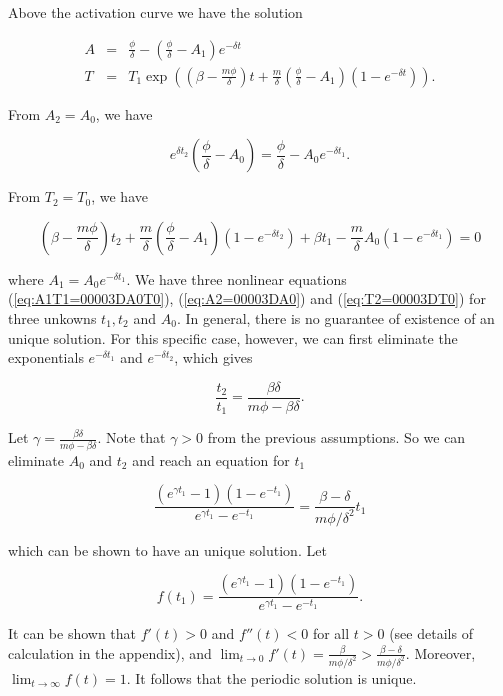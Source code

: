 \documentclass[review,authoryear]{elsarticle}
\begin{document}
Above the activation curve we have the solution 
\begin{linenomath*}
\begin{eqnarray*}
A & = & \frac{\phi}{\delta}-(\frac{\phi}{\delta}-A_{1})e^{-\delta t}\\
T & = & T_{1}\exp((\beta-\frac{m\phi}{\delta})t+\frac{m}{\delta}(\frac{\phi}{\delta}-A_{1})(1-e^{-\delta t})).
\end{eqnarray*}
\end{linenomath*}
From $A_{2}=A_{0}$, we have 
\begin{linenomath*}
\begin{equation}
e^{\delta t_{2}}(\frac{\phi}{\delta}-A_{0})=\frac{\phi}{\delta}-A_{0}e^{-\delta t_{1}}.\label{eq:A2=00003DA0}
\end{equation}
\end{linenomath*}
From $T_{2}=T_{0}$, we have
\begin{linenomath*} 
\begin{equation}
(\beta-\frac{m\phi}{\delta})t_{2}+\frac{m}{\delta}(\frac{\phi}{\delta}-A_{1})(1-e^{-\delta t_{2}})+\beta t_{1}-\frac{m}{\delta}A_{0}(1-e^{-\delta t_{1}})=0\label{eq:T2=00003DT0}
\end{equation}
\end{linenomath*}
where $A_{1}=A_{0}e^{-\delta t_{1}}$. We have three nonlinear equations (\ref{eq:A1T1=00003DA0T0}),
(\ref{eq:A2=00003DA0}) and (\ref{eq:T2=00003DT0}) for three unkowns
$t_{1},t_{2}$ and $A_{0}$. In general, there is no guarantee of existence
of an unique solution. For this specific case, however, we can first
eliminate the exponentials $e^{-\delta t_{1}}$ and $e^{-\delta t_{2}}$,
which gives 
\begin{linenomath*}
\[
\frac{t_{2}}{t_{1}}=\frac{\beta\delta}{m\phi-\beta\delta}.
\]
\end{linenomath*}
Let $\gamma=\frac{\beta\delta}{m\phi-\beta\delta}$. Note that $\gamma>0$
from the previous assumptions. So we can eliminate $A_{0}$ and $t_{2}$
and reach an equation for $t_{1}$
\begin{linenomath*}
\begin{equation}
\frac{(e^{\gamma t_{1}}-1)(1-e^{-t_{1}})}{e^{\gamma t_{1}}-e^{-t_{1}}}=\frac{\beta-\delta}{m\phi/\delta^{2}}t_{1}\label{eq:t1-period}
\end{equation}
\end{linenomath*}
which can be shown to have an unique solution. Let 
\begin{linenomath*}
\begin{equation}
f(t_{1})=\frac{(e^{\gamma t_{1}}-1)(1-e^{-t_{1}})}{e^{\gamma t_{1}}-e^{-t_{1}}}.\label{eq:f(t1)}
\end{equation}
\end{linenomath*}
It can be shown that $f'(t)>0$ and $f''(t)<0$ for all $t>0$ (see
details of calculation in the appendix), and $\lim_{t\to0}f'(t)=\frac{\beta}{m\phi/\delta^{2}}>\frac{\beta-\delta}{m\phi/\delta^{2}}$.
Moreover, $\lim_{t\to\infty}f(t)=1$. It follows that the periodic
solution is unique.
\end{document}
